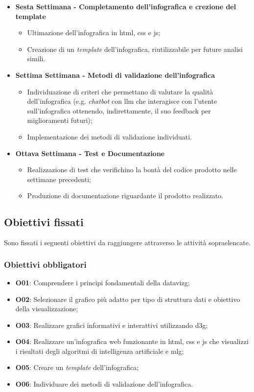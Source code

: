 \begin{itemize}
    \item \textbf{Sesta Settimana - Completamento dell'infografica e crezione del template} 
    \begin{itemize}
        \item Ultimazione dell'infografica in \gls{html}, \gls{css} e \gls{js};
        \item Creazione di un \emph{template} dell'infografica, riutilizzabile per future analisi simili.
    \end{itemize}
    \item \textbf{Settima Settimana - Metodi di validazione dell'infografica} 
    \begin{itemize}
        \item Individuazione di criteri che permettano di valutare la qualità dell'infografica (e.g. \textit{chatbot} con \gls{llm} che interagisce con l'utente sull'infografica ottenendo, indirettamente, il suo feedback per miglioramenti futuri);
        \item Implementazione dei metodi di validazione individuati.
    \end{itemize}
    \item \textbf{Ottava Settimana - Test e Documentazione} 
    \begin{itemize}
        \item Realizzazione di test che verifichino la bontà del codice prodotto nelle settimane precedenti;
        \item Produzione di documentazione riguardante il prodotto realizzato.
    \end{itemize}
\end{itemize}


\subsection{Obiettivi fissati}
Sono fissati i seguenti obiettivi da raggiungere attraverso le attività sopraelencate.

\subsubsection{Obiettivi obbligatori}
\begin{itemize}
    \item \textbf{O01}: Comprendere i principi fondamentali della \gls{datavizg};
    \item \textbf{O02}: Selezionare il grafico più adatto per tipo di struttura dati e obiettivo della visualizzazione;
    \item \textbf{O03}: Realizzare grafici informativi e interattivi utilizzando \gls{d3g};
    \item \textbf{O04}: Realizzare un'infografica web funzionante in \gls{html}, \gls{css} e \gls{js} che visualizzi i risultati degli algoritmi di intelligenza artificiale e \gls{mlg};
    \item \textbf{O05}: Creare un \emph{template} dell'infografica;
    \item \textbf{O06}: Individuare dei metodi di validazione dell'infografica.
\end{itemize}

